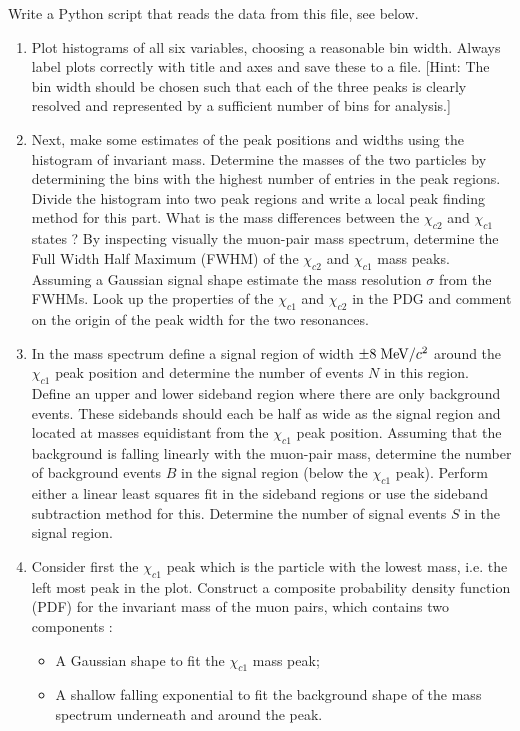 Write a Python script that reads the data from this file, see below. 


\begin{enumerate}

\item Plot histograms of all six variables, choosing a reasonable bin width. Always label plots correctly with title and axes and save these to a file. [Hint: The bin width should be chosen such that each of the three peaks is clearly resolved and represented by a sufficient number of bins for analysis.]

\item Next, make some estimates of the peak positions and widths using the histogram of invariant mass.  Determine the masses of the two particles by determining the bins with the highest number of entries in the peak regions. Divide the histogram into two peak regions and write a local peak finding method for this part. What is the mass differences between the $\chi_{c2}$ and $\chi_{c1}$ states ? By inspecting visually the muon-pair mass spectrum, determine the Full Width Half Maximum (FWHM) of the $\chi_{c2}$ and $\chi_{c1}$ mass peaks. Assuming a Gaussian signal shape estimate the mass resolution $\sigma$ from the FWHMs. Look up the properties of the $\chi_{c1}$ and $\chi_{c2}$ in the PDG and comment on the origin of the peak width for the two resonances.

\item In the  mass spectrum define a signal region of width $\pm 8\; {\rm MeV}/c^2$ around the $\chi_{c1}$  peak position and determine the number of events $N$ in this region. Define an upper and lower sideband region where there are only background events. These sidebands should each be half as wide as the signal region and located at masses equidistant from the $\chi_{c1}$  peak position. Assuming that the background is falling linearly with the muon-pair mass, determine the number of background events $B$ in the signal region (below the $\chi_{c1}$ peak). Perform either a linear least squares fit in the sideband regions or use the sideband subtraction method for this. Determine the number of signal events $S$ in the signal region.

\item Consider first the $\chi_{c1}$ peak which is the particle with the lowest
mass, i.e. the left most peak in the plot. Construct a composite probability density
function (PDF) for the invariant mass of the muon pairs, which
contains two components : 
\begin{itemize}
\item A Gaussian shape to fit the  $\chi_{c1}$ mass peak;
\item A shallow falling exponential to fit the background shape of the mass spectrum underneath and around the peak.
\end{itemize}


\end{enumerate}
